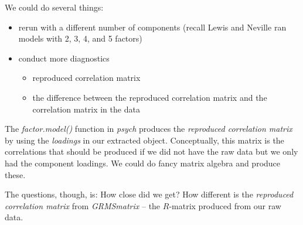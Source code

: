 \documentclass[
  english,
]{book}
\newenvironment{Shaded}{\begin{snugshade}}{\end{snugshade}}
\newcommand{\CommentTok}[1]{\textcolor[rgb]{0.56,0.35,0.01}{\textit{#1}}}
\newcommand{\DecValTok}[1]{\textcolor[rgb]{0.00,0.00,0.81}{#1}}
\newcommand{\KeywordTok}[1]{\textcolor[rgb]{0.13,0.29,0.53}{\textbf{#1}}}
\newcommand{\NormalTok}[1]{#1}
\newcommand{\OperatorTok}[1]{\textcolor[rgb]{0.81,0.36,0.00}{\textbf{#1}}}
\providecommand{\tightlist}{%
  \setlength{\itemsep}{0pt}\setlength{\parskip}{0pt}}
\begin{document}
We could do several things:

\begin{itemize}
\tightlist
\item
  rerun with a different number of components (recall Lewis and Neville \citeyearpar{lewis_construction_2015} ran models with 2, 3, 4, and 5 factors)
\item
  conduct more diagnostics

  \begin{itemize}
  \tightlist
  \item
    reproduced correlation matrix
  \item
    the difference between the reproduced correlation matrix and the correlation matrix in the data
  \end{itemize}
\end{itemize}

The \emph{factor.model()} function in \emph{psych} produces the \emph{reproduced correlation matrix} by using the \emph{loadings} in our extracted object. Conceptually, this matrix is the correlations that should be produced if we did not have the raw data but we only had the component loadings. We could do fancy matrix algebra and produce these.

The questions, though, is: How close did we get? How different is the \emph{reproduced correlation matrix} from \emph{GRMSmatrix} -- the \(R\)-matrix produced from our raw data.

\begin{Shaded}
\end{Shaded}
\end{document}
